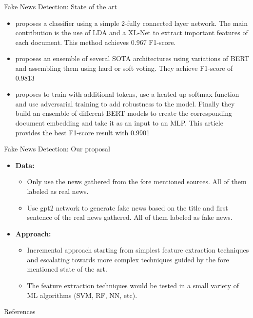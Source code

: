 \documentclass[aspectratio=169]{beamer}
\begin{document}
\begin{frame}{Fake News Detection: State of the art}
    \begin{itemize}
        \item \cite{XLNetCovid} proposes a classifier using a simple 2-fully connected layer network. The main contribution is the use of LDA and a XL-Net to extract important features of each document. This method achieves 0.967 F1-score.
        
        \item \cite{Heuristic} proposes an ensemble of several SOTA architectures using variations of BERT and assembling them using hard or soft voting. They achieve F1-score of 0.9813
        
        \item \cite{TranformerBasedFineTuning} proposes to train with additional tokens, use a heated-up softmax function and use adversarial training to add robustness to the model. Finally they build an ensemble of different BERT models to create the corresponding document embedding and take it as an input to an MLP. This article provides the best F1-score result with 0.9901
    \end{itemize}
\end{frame}

\begin{frame}{Fake News Detection: Our proposal}
\begin{itemize}
    \item \textbf{Data:}
    \begin{itemize}
        \item Only use the news gathered from the fore mentioned sources. All of them labeled as real news.
        \item Use gpt2 network to generate fake news based on the title and first sentence of the real news gathered. All of them labeled as fake news.
    \end{itemize}
    \item \textbf{Approach:}
    \begin{itemize}
        \item Incremental approach starting from simplest feature extraction techniques and escalating towards more complex techniques guided by the fore mentioned state of the art.
        \item The feature extraction techniques would be tested in a small variety of ML algorithms (SVM, RF, NN, etc).
    \end{itemize}
\end{itemize}
\end{frame}

\begin{frame}[allowframebreaks]{References}
    
    
\end{frame}
\end{document}
